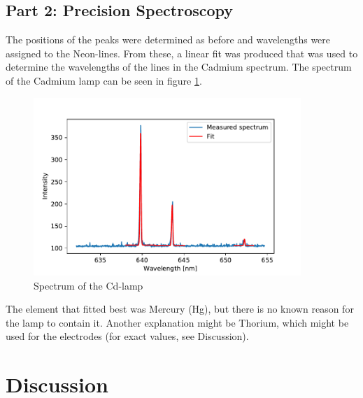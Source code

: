 \documentclass[12pt]{article}
\begin{document}
\subsection{Part 2: Precision Spectroscopy}
	The positions of the peaks were determined as before and wavelengths were assigned to the Neon-lines. From these, a linear fit was produced that was used to determine the wavelengths of the lines in the Cadmium spectrum. The spectrum of the Cadmium lamp can be seen in figure \ref{fig:cd_spectrum}.
\\
\begin{figure}
\centering
\includegraphics[width=0.9\textwidth]{fig/cd_spectrum_nm.pdf}
\caption{Spectrum of the Cd-lamp}
\label{fig:cd_spectrum}
\end{figure} 
	The element that fitted best was Mercury (Hg), but there is no known reason for the lamp to contain it. Another explanation might be Thorium, which might be used for the electrodes (for exact values, see Discussion).

\section{Discussion}
\end{document}
